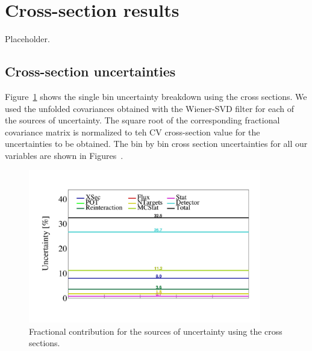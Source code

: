 \documentclass{article}
\begin{document}
\clearpage

\section{Cross-section results}
Placeholder.

\subsection{Cross-section uncertainties}\label{sec:cross-section-uncertainties}

Figure~\ref{fig:single-bin-uncertainties-cross-sections} shows the single bin uncertainty breakdown 
using the cross sections. We used the unfolded covariances obtained with the Wiener-SVD filter 
for each of the sources of uncertainty. The square root of the corresponding fractional covariance 
matrix is normalized to teh CV cross-section value for the uncertainties to be obtained.
The bin by bin cross section uncertainties for all our variables are shown in
Figures~.

\begin{figure}[H]
    \centering 
    \includegraphics[width=4in]{../Figs/CAFAna/UnfBinUncertainties/EventCount.png}
    \caption{Fractional contribution for the sources of uncertainty using the cross sections.}
    \label{fig:single-bin-uncertainties-cross-sections}
\end{figure}
\end{document}
